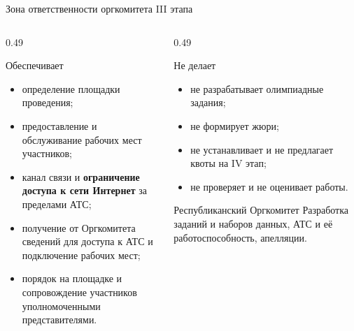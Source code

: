 \begin{frame}{Зона ответственности оргкомитета III этапа}
  \vspace{0.3em}
  \begin{columns}[T]
    \begin{column}{0.49\textwidth}
      \begin{block}{Обеспечивает}
        \begin{itemize}\setlength\itemsep{0.28em}
          \item определение площадки проведения;
          \item предоставление и обслуживание рабочих мест участников;
          \item канал связи и \textbf{ограничение доступа к сети Интернет}
                за пределами АТС;
          \item получение от Оргкомитета сведений для доступа к АТС
                и подключение рабочих мест;
          \item порядок на площадке и сопровождение участников
                уполномоченными представителями.
        \end{itemize}
      \end{block}
    \end{column}
    \begin{column}{0.49\textwidth}
      \begin{block}{Не делает}
        \begin{itemize}\setlength\itemsep{0.28em}
          \item не разрабатывает олимпиадные задания;
          \item не формирует жюри;
          \item не устанавливает и не предлагает квоты на IV этап;
          \item не проверяет и не оценивает работы.
        \end{itemize}
      \end{block}
      \begin{block}{Республиканский Оргкомитет}
        Разработка заданий и наборов данных, АТС и её работоспособность, апелляции.
      \end{block}
    \end{column}
  \end{columns}
\end{frame}
